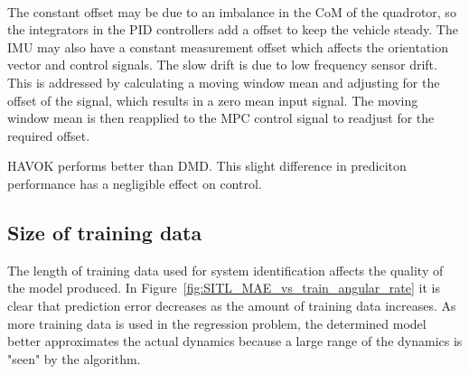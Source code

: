         \paragraph{}
        The constant offset may be due to an imbalance in the CoM of the quadrotor, 
        so the integrators in the PID controllers add a offset to keep the vehicle steady.
        The IMU may also have a constant measurement offset which affects the orientation vector and control signals.
        The slow drift is due to low frequency sensor drift.
        This is addressed by calculating a moving window mean and adjusting for the offset of the signal, 
        which results in a zero mean input signal.
        The moving window mean is then reapplied to the MPC control signal 
        to readjust for the required offset.

        
        
        

        

        HAVOK performs better than DMD.
        This slight difference in prediciton performance has a negligible effect on control.
        

    

    \subsection{Size of training data}
        The length of training data used for system identification affects the quality of the model produced.
        In Figure~\ref{fig:SITL_MAE_vs_train_angular_rate} it is clear that prediction error decreases as the amount of training data increases.
        As more training data is used in the regression problem, 
        the determined model better approximates the actual dynamics because a large range of the dynamics is "seen" by the algorithm.
        
